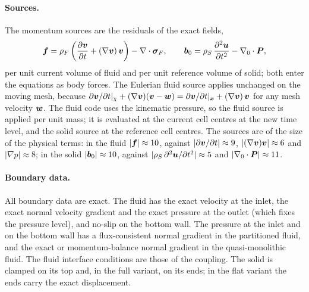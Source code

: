 \paragraph{Sources.}
The momentum sources are the residuals of the exact fields,
\begin{equation}
	\boldsymbol{f} = \rho_F\left(\frac{\partial\boldsymbol{v}}{\partial t} + (\nabla\boldsymbol{v})\,\boldsymbol{v}\right) - \nabla\cdot\boldsymbol{\sigma}_F,
	\qquad
	\boldsymbol{b}_0 = \rho_S\,\frac{\partial^2\boldsymbol{u}}{\partial t^2} - \nabla_0\cdot\boldsymbol{P},
\end{equation}
per unit current volume of fluid and per unit reference volume of solid; both enter the equations as body forces.
The Eulerian fluid source applies unchanged on the moving mesh, because $\partial\boldsymbol{v}/\partial t|_{\chi} + (\nabla\boldsymbol{v})(\boldsymbol{v} - \boldsymbol{w}) = \partial\boldsymbol{v}/\partial t|_{\boldsymbol{x}} + (\nabla\boldsymbol{v})\,\boldsymbol{v}$ for any mesh velocity $\boldsymbol{w}$.
The fluid code uses the kinematic pressure, so the fluid source is applied per unit mass; it is evaluated at the current cell centres at the new time level, and the solid source at the reference cell centres.
The sources are of the size of the physical terms: in the fluid $|\boldsymbol{f}| \approx 10$, against $|\partial\boldsymbol{v}/\partial t| \approx 9$, $|(\nabla\boldsymbol{v})\boldsymbol{v}| \approx 6$ and $|\nabla p| \approx 8$; in the solid $|\boldsymbol{b}_0| \approx 10$, against $|\rho_S\,\partial^2\boldsymbol{u}/\partial t^2| \approx 5$ and $|\nabla_0\cdot\boldsymbol{P}| \approx 11$.

\paragraph{Boundary data.}
All boundary data are exact.
The fluid has the exact velocity at the inlet, the exact normal velocity gradient and the exact pressure at the outlet (which fixes the pressure level), and no-slip on the bottom wall.
The pressure at the inlet and on the bottom wall has a flux-consistent normal gradient in the partitioned fluid, and the exact or momentum-balance normal gradient in the quasi-monolithic fluid.
The fluid interface conditions are those of the coupling.
The solid is clamped on its top and, in the full variant, on its ends; in the flat variant the ends carry the exact displacement.


